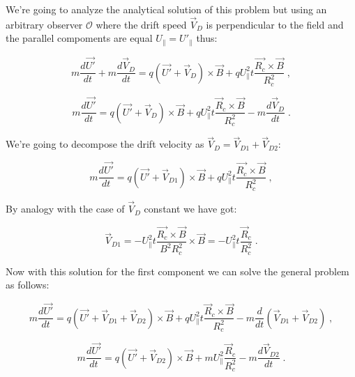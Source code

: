 \documentclass[spanish,notitlepage,letterpaper,11pt]{article} %
\numberwithin{equation}{subsection}
\begin{document}
            We're going to analyze the analytical solution of this problem but using an arbitrary observer $\mathcal{O}$ where the drift speed $\Vec{V}_D$ is perpendicular to the field and the parallel compoments are equal $U_{\parallel} = U'_{\parallel}$ thus:

            \begin{equation*}
                m\frac{d\Vec{U'}}{dt} + m\frac{d\Vec{V}_D}{dt} = q(\Vec{U'} + \Vec{V}_D) \times \Vec{B} + qU_{\parallel}^2t\frac{\Vec{R_c}\times \Vec{B}}{R_c^2}\;,
            \end{equation*}

            \begin{equation*}
                m\frac{d\Vec{U'}}{dt} = q(\Vec{U'} + \Vec{V}_D)\times\Vec{B} + qU_{\parallel}^2t\frac{\Vec{R}_c \times \Vec{B}}{R_c^2} - m\frac{d\Vec{V}_D}{dt}\;.
            \end{equation*}

            We're going to decompose the drift velocity as $\Vec{V}_D = \Vec{V}_{D1} + \Vec{V}_{D2}:$

            \begin{equation*}
                m\frac{d\Vec{U'}}{dt} = q(\Vec{U'} + \Vec{V}_{D1}) \times \Vec{B} + qU_{\parallel}^2t\frac{\Vec{R_c}\times\Vec{B}}{R_c^2}\;,
            \end{equation*}

            By analogy with the case of $\Vec{V}_D$ constant we have got:

            \begin{equation}
                \Vec{V}_{D1} = -U_{\parallel}^2t\frac{\Vec{R_c}\times \Vec{B}}{B^2R_c^2}\times \Vec{B} = -U_{\parallel}^2t\frac{\Vec{R}_c}{R_c^2}\;.
            \end{equation}

            Now with this solution for the first component we can solve the general problem as follows:

            \begin{equation*}
                m\frac{d\Vec{U'}}{dt} = q(\Vec{U'} + \Vec{V}_{D1} + \Vec{V}_{D2})\times\Vec{B} + qU_{\parallel}^2t \frac{\Vec{R}_c\times\Vec{B}}{R_c^2} - m\frac{d}{dt}(\Vec{V}_{D1} + \Vec{V}_{D2})\;,
            \end{equation*}

            \begin{equation}
                m\frac{d\Vec{U'}}{dt} = q(\Vec{U'} + \Vec{V}_{D2})\times \Vec{B} + mU_{\parallel}^2\frac{\Vec{R}_c}{R_c^2} - m\frac{d\Vec{V}_{D2}}{dt}\;.
            \end{equation}
\end{document}
